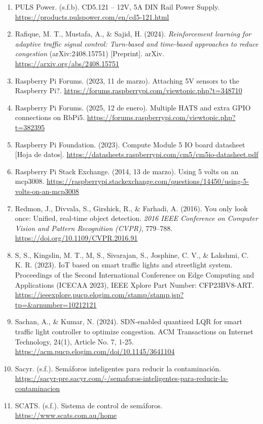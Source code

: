 \begin{enumerate}
\item
  PULS Power. (s.f.b). CD5.121 -- 12V, 5A DIN Rail Power Supply. \url{https://products.pulspower.com/en/cd5-121.html}
\item
  Rafique, M. T., Mustafa, A., \& Sajid, H. (2024). \emph{Reinforcement learning for adaptive traffic signal control: Turn-based and time-based approaches to reduce congestion} (arXiv:2408.15751) [Preprint]. arXiv. \url{https://arxiv.org/abs/2408.15751}
\item
  Raspberry Pi Forums. (2023, 11 de marzo). Attaching 5V sensors to the Raspberry Pi?. \url{https://forums.raspberrypi.com/viewtopic.php?t=348710}
\item
  Raspberry Pi Forums. (2025, 12 de enero). Multiple HATS and extra GPIO connections on RbPi5. \url{https://forums.raspberrypi.com/viewtopic.php?t=382395}
\item
  Raspberry Pi Foundation. (2023). Compute Module 5 IO board datasheet {[}Hoja de datos{]}. \url{https://datasheets.raspberrypi.com/cm5/cm5io-datasheet.pdf}
\item
  Raspberry Pi Stack Exchange. (2014, 13 de marzo). Using 5 volts on an mcp3008. \url{https://raspberrypi.stackexchange.com/questions/14450/using-5-volts-on-an-mcp3008}
\item
  Redmon, J., Divvala, S., Girshick, R., \& Farhadi, A. (2016). You only look once: Unified, real-time object detection. \emph{2016 IEEE Conference on Computer Vision and Pattern Recognition (CVPR)}, 779--788. \url{https://doi.org/10.1109/CVPR.2016.91}
\item
  S, S., Kingslin, M. T., M, S., Sivarajan, S., Josphine, C. V., \& Lakshmi, C. K. R. (2023). IoT based on smart traffic lights and streetlight system. Proceedings of the Second International Conference on Edge Computing and Applications (ICECAA 2023), IEEE Xplore Part Number: CFP23BV8-ART. \url{https://ieeexplore.pucp.elogim.com/stamp/stamp.jsp?tp=&arnumber=10212121}
\item
  Sachan, A., \& Kumar, N. (2024). SDN-enabled quantized LQR for smart traffic light controller to optimize congestion. ACM Transactions on Internet Technology, 24(1), Article No. 7, 1-25. \url{https://acm.pucp.elogim.com/doi/10.1145/3641104}
\item
  Sacyr. (s.f.). Semáforos inteligentes para reducir la contaminación. \url{https://sacyr-pre.sacyr.com/-/semaforos-inteligentes-para-reducir-la-contaminacion}
\item
  SCATS. (s.f.). Sistema de control de semáforos. \url{https://www.scats.com.au/home}

\end{enumerate}
